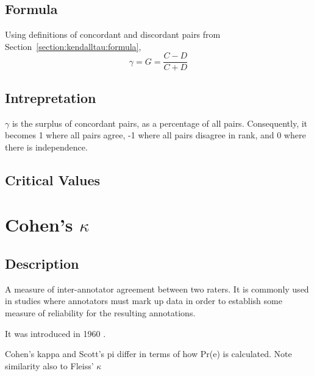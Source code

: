 \documentclass[11pt]{article}
\begin{document}
\subsection{Formula}
Using definitions of concordant and discordant pairs from Section~\ref{section:kendalltau:formula},
$$
\gamma = G = \frac{C-D}{C+D}
$$

\subsection{Intrepretation}
$\gamma$ is the surplus of concordant pairs, as a percentage of all pairs.  Consequently, it becomes 1 where all pairs agree, -1 where all pairs disagree in rank, and 0 where there is independence.

\subsection{Critical Values}






\section{Cohen's $\kappa$} %
\subsection{Description}
A measure of inter-annotator agreement between two raters.  It is commonly used in studies where annotators must mark up data in order to establish some measure of reliability for the resulting annotations.

It was introduced in 1960 \cite{cohen1960coefficient}.

Cohen's kappa and Scott's pi differ in terms of how Pr(e) is calculated.  Note similarity also to Fleiss' $\kappa$ %
\end{document}
